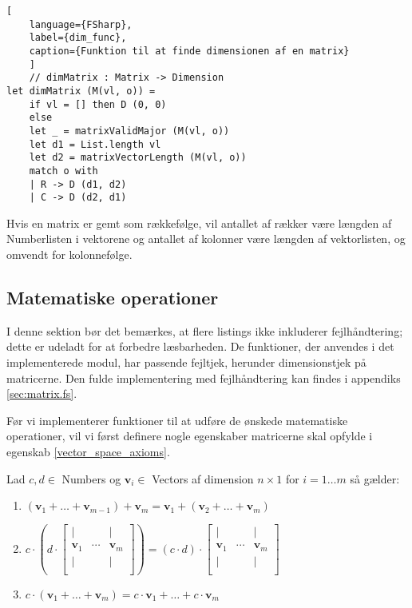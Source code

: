 \begin{lstlisting}[
    language={FSharp}, 
    label={dim_func}, 
    caption={Funktion til at finde dimensionen af en matrix}
    ]
    // dimMatrix : Matrix -> Dimension
let dimMatrix (M(vl, o)) =
    if vl = [] then D (0, 0)
    else
    let _ = matrixValidMajor (M(vl, o))
    let d1 = List.length vl
    let d2 = matrixVectorLength (M(vl, o))
    match o with
    | R -> D (d1, d2)
    | C -> D (d2, d1)
\end{lstlisting}

Hvis en matrix er gemt som rækkefølge, vil antallet af rækker være længden af Numberlisten i vektorene og antallet af kolonner være længden af vektorlisten, og omvendt for kolonnefølge.

\subsection{Matematiske operationer}
I denne sektion bør det bemærkes, at flere listings ikke inkluderer fejlhåndtering; dette er udeladt for at forbedre læsbarheden. De funktioner, der anvendes i det implementerede modul, har passende fejltjek, herunder dimensionstjek på matricerne. Den fulde implementering med fejlhåndtering kan findes i appendiks \ref{sec:matrix.fs}.

Før vi implementerer funktioner til at udføre de ønskede matematiske operationer, vil vi først definere nogle egenskaber matricerne skal opfylde i egenskab \ref{vector_space_axioms}.
\vspace{0.5cm}
\begin{egenskab}\label{vector_space_axioms}
    Lad $c, d \in$ Numbers og $\mathbf{v}_i \in $ Vectors af dimension $n \times 1$ for $i = 1 \dots m$ så gælder:
    \begin{enumerate}
        \item $(\mathbf{v}_1 + \dots + \mathbf{v}_{m-1}) + \mathbf{v}_m = \mathbf{v}_1 + (\mathbf{v}_2 + \dots + \mathbf{v}_m)$
        \item $c \cdot \left(d \cdot \begin{bmatrix}
            | &        & | \\
            \mathbf{v}_{1} & \cdots & \mathbf{v}_{m} \\
            | &        & | \\
        \end{bmatrix}\right) = (c \cdot d) \cdot \begin{bmatrix}
            | &        & | \\
            \mathbf{v}_{1} & \cdots & \mathbf{v}_{m} \\
            | &        & | \\
        \end{bmatrix}$
        
        \item $c \cdot (\mathbf{v}_1 + \dots +\mathbf{v}_m) = c \cdot \mathbf{v}_1 + \dots + c \cdot \mathbf{v}_m$
    \end{enumerate}
\end{egenskab}

